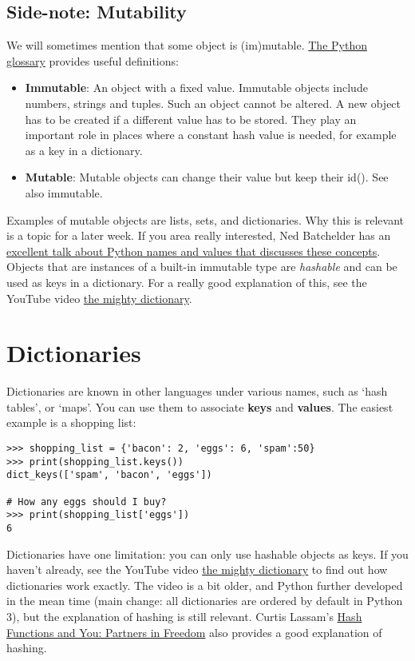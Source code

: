\documentclass[12pt]{book}
\begin{document}
\subsection*{Side-note: Mutability}

We will sometimes mention that some object is (im)mutable. \href{https://docs.python.org/3/glossary.html}{The Python glossary} provides useful definitions:

\begin{itemize}
\item \textbf{Immutable}: An object with a fixed value. Immutable objects
  include numbers, strings and tuples. Such an object cannot be altered.
  A new object has to be created if a different value has to be stored.
  They play an important role in places where a constant hash value is
  needed, for example as a key in a dictionary.
\item \textbf{Mutable}: Mutable objects can change their value but keep
  their id(). See also immutable.
\end{itemize}

Examples of mutable objects are lists, sets, and dictionaries. Why this is relevant is a topic for a later week. If you area really interested, Ned Batchelder has an \href{http://nedbatchelder.com/text/names1.html}{excellent talk about
Python names and values that discusses these concepts}. Objects that are instances of a built-in immutable type are \emph{hashable} and can be used as keys in a dictionary. For a really good explanation of this, see the YouTube video \href{https://www.youtube.com/watch?v=C4Kc8xzcA68}{the mighty dictionary}.

\section{Dictionaries}
Dictionaries are known in other languages under various names, such as `hash tables', or `maps'. You can use them to associate \textbf{keys} and \textbf{values}. The easiest example is a shopping list:

\begin{lstlisting}
>>> shopping_list = {'bacon': 2, 'eggs': 6, 'spam':50}
>>> print(shopping_list.keys())
dict_keys(['spam', 'bacon', 'eggs'])

# How any eggs should I buy?
>>> print(shopping_list['eggs'])
6
\end{lstlisting}

Dictionaries have one limitation: you can only use hashable objects as keys. If you haven't already, see the YouTube video \href{https://www.youtube.com/watch?v=C4Kc8xzcA68}{the mighty dictionary} to find out how dictionaries work exactly. The video is a bit older, and Python further developed in the mean time (main change: all dictionaries are ordered by default in Python 3), but the explanation of hashing is still relevant. Curtis Lassam's \href{https://www.youtube.com/watch?v=IGwNQfjLTp0}{Hash Functions and You: Partners in Freedom} also provides a good explanation of hashing.
\end{document}
